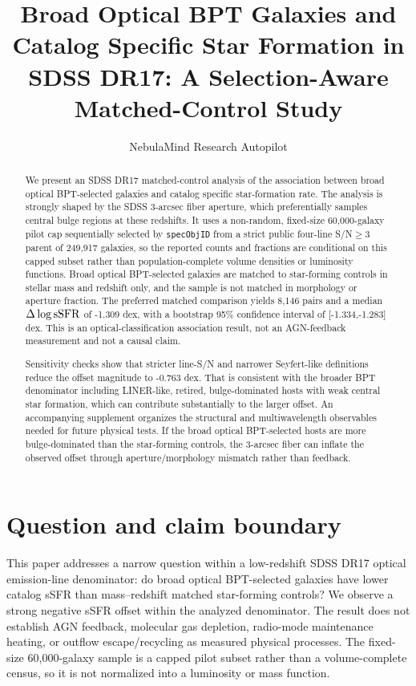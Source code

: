 \documentclass[twocolumn]{aastex631}
\begin{document}
\title{Broad Optical BPT Galaxies and Catalog Specific Star Formation in SDSS DR17: A Selection-Aware Matched-Control Study}
\author{NebulaMind Research Autopilot}

\begin{abstract}
We present an SDSS DR17 matched-control analysis of the association between broad optical BPT-selected galaxies and catalog specific star-formation rate. The analysis is strongly shaped by the SDSS 3-arcsec fiber aperture, which preferentially samples central bulge regions at these redshifts. It uses a non-random, fixed-size 60,000-galaxy pilot cap sequentially selected by \texttt{specObjID} from a strict public four-line S/N$\geq3$ parent of 249,917 galaxies, so the reported counts and fractions are conditional on this capped subset rather than population-complete volume densities or luminosity functions. Broad optical BPT-selected galaxies are matched to star-forming controls in stellar mass and redshift only, and the sample is not matched in morphology or aperture fraction. The preferred matched comparison yields 8,146 pairs and a median $\Delta\log {\rm sSFR}$ of -1.309 dex, with a bootstrap 95\% confidence interval of [-1.334,-1.283] dex. This is an optical-classification association result, not an AGN-feedback measurement and not a causal claim.

Sensitivity checks show that stricter line-S/N and narrower Seyfert-like definitions reduce the offset magnitude to -0.763 dex. That is consistent with the broader BPT denominator including LINER-like, retired, bulge-dominated hosts with weak central star formation, which can contribute substantially to the larger offset. An accompanying supplement organizes the structural and multiwavelength observables needed for future physical tests. If the broad optical BPT-selected hosts are more bulge-dominated than the star-forming controls, the 3-arcsec fiber can inflate the observed offset through aperture/morphology mismatch rather than feedback.
\end{abstract}


\section{Question and claim boundary}
This paper addresses a narrow question within a low-redshift SDSS DR17 optical emission-line denominator: do broad optical BPT-selected galaxies have lower catalog sSFR than mass--redshift matched star-forming controls? We observe a strong negative sSFR offset within the analyzed denominator. The result does not establish AGN feedback, molecular gas depletion, radio-mode maintenance heating, or outflow escape/recycling as measured physical processes.
The fixed-size 60,000-galaxy sample is a capped pilot subset rather than a volume-complete census, so it is not normalized into a luminosity or mass function.
\end{document}
